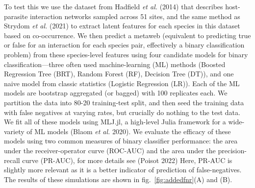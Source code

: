 \documentclass[11pt]{article}
\begin{document}
To test this we use the dataset from Hadfield \emph{et al.} (2014) that
describes host-parasite interaction networks sampled across 51 sites,
and the same method as Strydom \emph{et al.} (2021) to extract latent
features for each species in this dataset based on co-occurrence. We
then predict a metaweb (equivalent to predicting true or false for an
interaction for each species pair, effectively a binary classification
problem) from these species-level features using four candidate models
for binary classification---three often used machine-learning (ML)
methods (Boosted Regression Tree (BRT), Random Forest (RF), Decision
Tree (DT)), and one naive model from classic statistics (Logistic
Regression (LR)). Each of the ML models are bootstrap aggregated (or
bagged) with 100 replicates each. We partition the data into 80-20
training-test split, and then seed the training data with false
negatives at varying rates, but crucially do nothing to the test data.
We fit all of these models using MLJ.jl, a high-level Julia framework
for a wide-variety of ML models (Blaom \emph{et al.} 2020). We evaluate
the efficacy of these models using two common measures of binary
classifier performance: the area under the receiver-operator curve
(ROC-AUC) and the area under the precision-recall curve (PR-AUC), for
more details see (Poisot 2022) Here, PR-AUC is slightly more relevant as
it is a better indicator of prediction of false-negatives. The results
of these simulations are shown in fig.~\ref{fig:addedfnr}(A) and (B).
\end{document}
